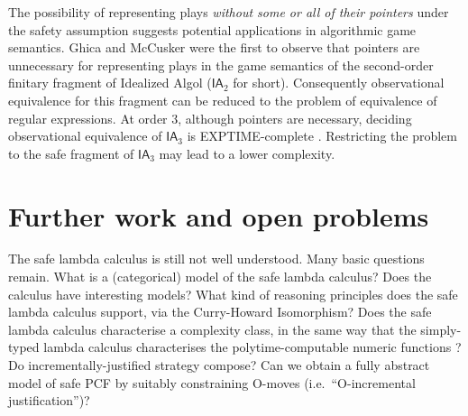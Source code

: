 \documentclass{llncs}
\newcommand\ialgol{\textsf{IA}}
\begin{document}
The possibility of representing plays \emph{without some or all of
  their pointers} under the safety assumption suggests potential
applications in algorithmic game semantics. Ghica and McCusker
\cite{ghicamccusker00} were the first to observe that pointers are
unnecessary for representing plays in the game semantics of the
second-order finitary fragment of Idealized Algol ($\ialgol_2$ for
short). Consequently observational equivalence for this fragment can
be reduced to the problem of equivalence of regular expressions.  At
order $3$, although pointers are necessary, deciding observational
equivalence of $\ialgol_3$ is EXPTIME-complete
\cite{DBLP:journals/apal/Ong04,DBLP:conf/fossacs/MurawskiW05}. Restricting
the problem to the safe fragment of $\ialgol_3$ may lead to a lower
complexity.





\section{Further work and open problems}

The safe lambda calculus is still not well understood. Many basic
questions remain. What is a (categorical) model of the safe lambda
calculus? Does the calculus have interesting models?  What kind of
reasoning principles does the safe lambda calculus support, via the
Curry-Howard Isomorphism? Does the safe lambda calculus characterise a
complexity class, in the same way that the simply-typed lambda
calculus characterises the polytime-computable numeric functions
\cite{DBLP:conf/tlca/LeivantM93}?  Do incrementally-justified strategy
compose? Can we obtain a fully abstract model of safe PCF by suitably
constraining O-moves (i.e.~``O-incremental justification'')?
\end{document}
